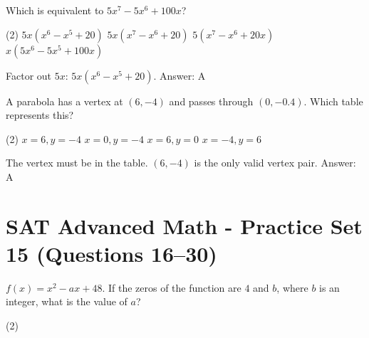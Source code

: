\documentclass[11pt,paper=a4,answers]{exam}
\begin{document}
\begin{questions}
\vspace{1cm}

\question
Which is equivalent to $5x^7 - 5x^6 + 100x$?
\begin{tasks}(2)
    \task $5x(x^6 - x^5 + 20)$
    \task $5x(x^7 - x^6 + 20)$
    \task $5(x^7 - x^6 + 20x)$
    \task $x(5x^6 - 5x^5 + 100x)$
\end{tasks}

\begin{solution}
Factor out $5x$: $5x(x^6 - x^5 + 20)$.
\vspace{5pt}
Answer: \colorbox{yellow!100}{A}
\end{solution}

\vspace{1cm}

\question
\begin{center}
\end{center}
A parabola has a vertex at $(6, -4)$ and passes through $(0, -0.4)$. Which table represents this?
\begin{tasks}(2)
    \task $x=6, y=-4$ \task $x=0, y=-4$ \task $x=6, y=0$ \task $x=-4, y=6$
\end{tasks}

\begin{solution}
The vertex must be in the table. $(6, -4)$ is the only valid vertex pair.
\vspace{5pt}
Answer: \colorbox{yellow!100}{A}
\end{solution}

\vspace{1cm}

\section*{SAT Advanced Math - Practice Set 15 (Questions 16--30)}

\question
$f(x) = x^2 - ax + 48$. If the zeros of the function are $4$ and $b$, where $b$ is an integer, what is the value of $a$?
\begin{tasks}(2)
       
\end{tasks}


\end{questions}
\end{document}
